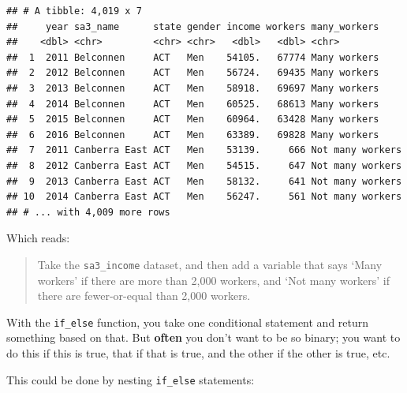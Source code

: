 \documentclass[]{book}
\newenvironment{Shaded}{\begin{snugshade}}{\end{snugshade}}
\newcommand{\DataTypeTok}[1]{\textcolor[rgb]{0.13,0.29,0.53}{#1}}
\newcommand{\DecValTok}[1]{\textcolor[rgb]{0.00,0.00,0.81}{#1}}
\newcommand{\KeywordTok}[1]{\textcolor[rgb]{0.13,0.29,0.53}{\textbf{#1}}}
\newcommand{\NormalTok}[1]{#1}
\newcommand{\OperatorTok}[1]{\textcolor[rgb]{0.81,0.36,0.00}{\textbf{#1}}}
\newcommand{\StringTok}[1]{\textcolor[rgb]{0.31,0.60,0.02}{#1}}
\begin{document}
\begin{Shaded}
\end{Shaded}

\begin{verbatim}
## # A tibble: 4,019 x 7
##     year sa3_name      state gender income workers many_workers    
##    <dbl> <chr>         <chr> <chr>   <dbl>   <dbl> <chr>           
##  1  2011 Belconnen     ACT   Men    54105.   67774 Many workers    
##  2  2012 Belconnen     ACT   Men    56724.   69435 Many workers    
##  3  2013 Belconnen     ACT   Men    58918.   69697 Many workers    
##  4  2014 Belconnen     ACT   Men    60525.   68613 Many workers    
##  5  2015 Belconnen     ACT   Men    60964.   63428 Many workers    
##  6  2016 Belconnen     ACT   Men    63389.   69828 Many workers    
##  7  2011 Canberra East ACT   Men    53139.     666 Not many workers
##  8  2012 Canberra East ACT   Men    54515.     647 Not many workers
##  9  2013 Canberra East ACT   Men    58132.     641 Not many workers
## 10  2014 Canberra East ACT   Men    56247.     561 Not many workers
## # ... with 4,009 more rows
\end{verbatim}

Which reads:

\begin{quote}
Take the \texttt{sa3\_income} dataset, and then add a variable that says `Many workers' if there are more than 2,000 workers, and `Not many workers' if there are fewer-or-equal than 2,000 workers.
\end{quote}

With the \texttt{if\_else} function, you take one conditional statement and return something based on that. But \textbf{often} you don't want to be so binary; you want to do this if this is true, that if that is true, and the other if the other is true, etc.

This could be done by nesting \texttt{if\_else} statements:
\end{document}
